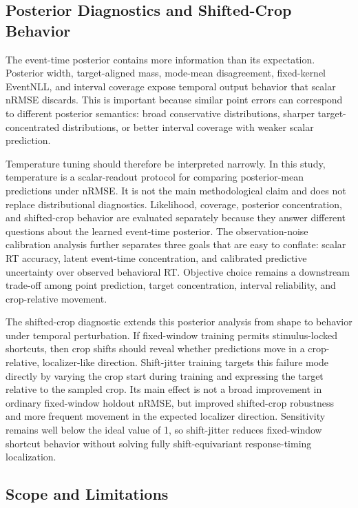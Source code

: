 \documentclass[12pt]{article}
\begin{document}
\subsection{Posterior Diagnostics and Shifted-Crop Behavior}

The event-time posterior contains more information than its expectation. Posterior width, target-aligned mass, mode-mean disagreement, fixed-kernel EventNLL, and interval coverage expose temporal output behavior that scalar nRMSE discards. This is important because similar point errors can correspond to different posterior semantics: broad conservative distributions, sharper target-concentrated distributions, or better interval coverage with weaker scalar prediction.

Temperature tuning should therefore be interpreted narrowly. In this study, temperature is a scalar-readout protocol for comparing posterior-mean predictions under nRMSE. It is not the main methodological claim and does not replace distributional diagnostics. Likelihood, coverage, posterior concentration, and shifted-crop behavior are evaluated separately because they answer different questions about the learned event-time posterior. The observation-noise calibration analysis further separates three goals that are easy to conflate: scalar RT accuracy, latent event-time concentration, and calibrated predictive uncertainty over observed behavioral RT. Objective choice remains a downstream trade-off among point prediction, target concentration, interval reliability, and crop-relative movement.

The shifted-crop diagnostic extends this posterior analysis from shape to behavior under temporal perturbation. If fixed-window training permits stimulus-locked shortcuts, then crop shifts should reveal whether predictions move in a crop-relative, localizer-like direction. Shift-jitter training targets this failure mode directly by varying the crop start during training and expressing the target relative to the sampled crop. Its main effect is not a broad improvement in ordinary fixed-window holdout nRMSE, but improved shifted-crop robustness and more frequent movement in the expected localizer direction. Sensitivity remains well below the ideal value of 1, so shift-jitter reduces fixed-window shortcut behavior without solving fully shift-equivariant response-timing localization.

\subsection{Scope and Limitations}
\end{document}
